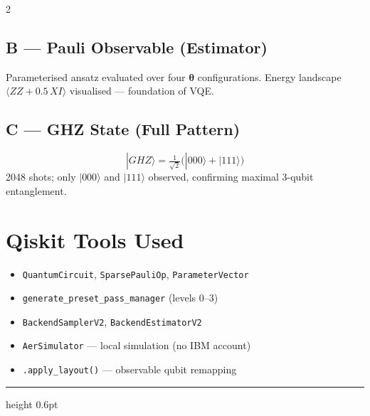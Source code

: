 ﻿\documentclass[10pt, a4paper]{article}
\begin{document}
\begin{multicols}{2}
\subsection{B --- Pauli Observable (Estimator)}
Parameterised ansatz evaluated over four $\boldsymbol\theta$ configurations. Energy landscape $\langle ZZ+0.5\,XI\rangle$ visualised --- foundation of VQE.

\subsection{C --- GHZ State (Full Pattern)}
\[|GHZ\rangle=\tfrac{1}{\sqrt{2}}\bigl(|000\rangle+|111\rangle\bigr)\]
2048 shots; only $|000\rangle$ and $|111\rangle$ observed, confirming maximal 3-qubit entanglement.

\section{Qiskit Tools Used}
\begin{itemize}
  \item \texttt{QuantumCircuit}, \texttt{SparsePauliOp}, \texttt{ParameterVector}
  \item \texttt{generate\_preset\_pass\_manager} (levels 0--3)
  \item \texttt{BackendSamplerV2}, \texttt{BackendEstimatorV2}
  \item \texttt{AerSimulator} --- local simulation (no IBM account)
  \item \texttt{.apply\_layout()} --- observable qubit remapping
\end{itemize}
\end{multicols}
\vspace{0.2em}
\hrule height 0.6pt
\vspace{0.3em}
\end{document}
